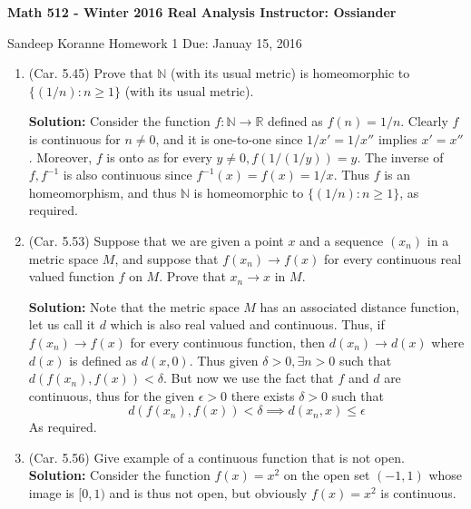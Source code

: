 \documentclass{article}
\def\ge{\geqslant}
\def\le{\leqslant}
\def\to{\rightarrow}
\def\NN{\mathbb N}
\def\RR{\mathbb R}
\begin{document}
\thispagestyle{empty}

\textbf{Math 512 - Winter 2016 \hfill Real Analysis  \hfill Instructor: Ossiander}

\hrulefill 
\medskip 

 {Sandeep Koranne \hfill Homework 1 \hfill Due: Januay 15, 2016}
\medskip

\begin{enumerate}


\item (Car. 5.45) Prove that $\NN$ (with its usual metric) is
homeomorphic to $\{(1/n): n \ge 1\}$ (with its usual metric).

\textbf{Solution:} Consider the function $f:\NN \to \RR$ defined
as $f(n) = 1/n$. Clearly $f$ is continuous for $n\ne 0$, and it is
one-to-one since $1/x'=1/x''$ implies $x'=x''$. Moreover, $f$ is
onto as for every $y\ne 0, f(1/(1/y))=y$. The inverse of $f, f^{-1}$
is also continuous since $f^{-1}(x)=f(x)=1/x$. Thus $f$ is an
homeomorphism, and thus $\NN$ is homeomorphic to 
$\{(1/n): n \ge 1\}$, as required.

\item (Car. 5.53) Suppose that we are given a point $x$ and a
sequence $(x_n)$ in a metric space $M$, and suppose that $f(x_n)\to f(x)$
for every continuous real valued function $f$ on $M$. Prove that
$x_n\to x$ in $M$.

\textbf{Solution:} Note that the metric space $M$ has an associated
distance function, let us call it $d$ which is also real valued
and continuous. Thus, if $f(x_n)\to f(x)$ for every continuous
function, then $d(x_n)\to d(x)$ where $d(x)$ is defined as $d(x,0)$.
Thus given $\delta>0, \exists n>0$ such that $d(f(x_n),f(x)) < \delta$.
But now we use the fact that $f$ and $d$ are continuous, thus
for the given $\epsilon>0$ there exists $\delta>0$ such that
\[
d(f(x_n),f(x)) < \delta \implies d(x_n,x) \le \epsilon
\]
As required.


\item (Car. 5.56) Give example of a continuous function that is not open.\\
\textbf{Solution:} Consider the function $f(x)=x^2$ on the open set
$(-1,1)$ whose image is $[0,1)$ and is thus not open, but obviously
$f(x)=x^2$ is continuous.


\end{enumerate}
\end{document}
